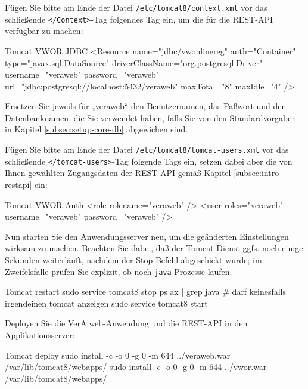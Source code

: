 \begin{minipage}{\linewidth}
Fügen Sie bitte am Ende der Datei \texttt{/etc/tomcat8/context.xml} vor
das schließende \texttt{</Context>}-Tag folgendes Tag ein, um die
für die REST-API verfügbar zu machen:

\begin{lstdump}[language=XML]{Tomcat VWOR JDBC}
<Resource name="jdbc/vwonlinereg" auth="Container" type="javax.sql.DataSource"
 driverClassName="org.postgresql.Driver" username="veraweb" password="veraweb"
 url="jdbc:postgresql://localhost:5432/veraweb" maxTotal="8" maxIdle="4" />
\end{lstdump}

Ersetzen Sie jeweils für „veraweb“ den Benutzernamen, das Paßwort und den
Datenbanknamen, die Sie verwendet haben, falls Sie von den Standardvorgaben
  in Kapitel \ref{subsec:setup-core-db}
abgewichen sind.
\end{minipage}

\begin{minipage}{\linewidth}
Fügen Sie bitte am Ende der Datei \texttt{/etc/tomcat8/tomcat-users.xml} vor
das schließende \texttt{</tomcat-users>}-Tag folgende Tags ein, setzen dabei
aber die von Ihnen gewählten Zugangsdaten der REST-API gemäß Kapitel
\ref{subsec:intro-restapi} ein:

\begin{lstdump}[language=XML]{Tomcat VWOR Auth}
<role rolename="veraweb" />
<user roles="veraweb" username="veraweb" password="veraweb" />
\end{lstdump}
\label{manual:restpw}
\end{minipage}

Nun starten Sie den Anwendungsserver neu, um die geänderten
Einstellungen wirksam zu machen. Beachten Sie dabei, daß der
Tomcat-Dienst ggfs. noch einige Sekunden weiterläuft, nachdem
der Stop-Befehl abgeschickt wurde; im Zweifelsfalle prüfen Sie
explizit, ob noch \texttt{java}-Prozesse laufen.\keinumbruch

\begin{minipage}{\linewidth}
\begin{lstdump}{Tomcat restart}
sudo service tomcat8 stop
ps ax | grep java # darf keinesfalls irgendeinen tomcat anzeigen
sudo service tomcat8 start
\end{lstdump}
\end{minipage}

\begin{minipage}{\linewidth}
Deployen Sie die VerA.web-Anwendung und die REST-API in den Applikationsserver:

\begin{lstdump}{Tomcat deploy}
sudo install -c -o 0 -g 0 -m 644 ../veraweb.war /var/lib/tomcat8/webapps/
sudo install -c -o 0 -g 0 -m 644 ../vwor.war /var/lib/tomcat8/webapps/
\end{lstdump}
\end{minipage}

